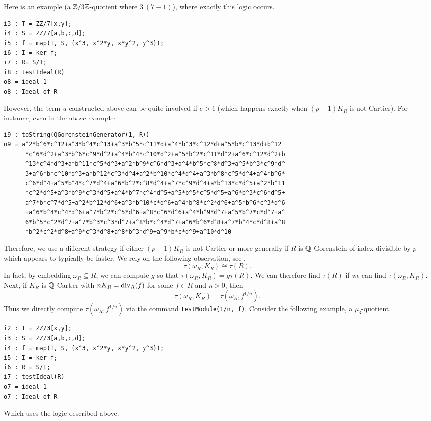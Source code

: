 \documentclass[11pt]{amsart}
\begin{document}
Here is an example (a $\mathbb{Z}/3\mathbb{Z}$-quotient where $3 | (7-1)$), where exactly this logic occurs.
\begin{verbatim}
i3 : T = ZZ/7[x,y];
i4 : S = ZZ/7[a,b,c,d];
i5 : f = map(T, S, {x^3, x^2*y, x*y^2, y^3});
i6 : I = ker f;
i7 : R= S/I;
i8 : testIdeal(R)
o8 = ideal 1
o8 : Ideal of R
\end{verbatim}
However, the term $u$ constructed above can be quite involved if $e > 1$ (which happens exactly when $(p -1)K_R$ is not Cartier).  For instance, even in the above example:
\begin{verbatim}
i9 : toString(QGorensteinGenerator(1, R))
o9 = a^2*b^6*c^12+a^3*b^4*c^13+a^3*b^5*c^11*d+a^4*b^3*c^12*d+a^5*b*c^13*d+b^12
      *c^6*d^2+a^3*b^6*c^9*d^2+a^4*b^4*c^10*d^2+a^5*b^2*c^11*d^2+a^6*c^12*d^2+b
      ^13*c^4*d^3+a*b^11*c^5*d^3+a^2*b^9*c^6*d^3+a^4*b^5*c^8*d^3+a^5*b^3*c^9*d^
      3+a^6*b*c^10*d^3+a*b^12*c^3*d^4+a^2*b^10*c^4*d^4+a^3*b^8*c^5*d^4+a^4*b^6*
      c^6*d^4+a^5*b^4*c^7*d^4+a^6*b^2*c^8*d^4+a^7*c^9*d^4+a*b^13*c*d^5+a^2*b^11
      *c^2*d^5+a^3*b^9*c^3*d^5+a^4*b^7*c^4*d^5+a^5*b^5*c^5*d^5+a^6*b^3*c^6*d^5+
      a^7*b*c^7*d^5+a^2*b^12*d^6+a^3*b^10*c*d^6+a^4*b^8*c^2*d^6+a^5*b^6*c^3*d^6
      +a^6*b^4*c^4*d^6+a^7*b^2*c^5*d^6+a^8*c^6*d^6+a^4*b^9*d^7+a^5*b^7*c*d^7+a^
      6*b^5*c^2*d^7+a^7*b^3*c^3*d^7+a^8*b*c^4*d^7+a^6*b^6*d^8+a^7*b^4*c*d^8+a^8
      *b^2*c^2*d^8+a^9*c^3*d^8+a^8*b^3*d^9+a^9*b*c*d^9+a^10*d^10
\end{verbatim}
Therefore, we use a different strategy if either $(p-1)K_R$ is not Cartier or more generally if $R$ is $\mathbb{Q}$-Gorenstein of index divisible by $p$ which appears to typically be faster.  We rely on the following observation, see \cite{}.
\[
\tau(\omega_R, K_R) \cong \tau(R).
\]
In fact, by embedding $\omega_R \subseteq R$, we can compute $g$ so that $\tau(\omega_R, K_R) = g \tau(R)$.  We can therefore find $\tau(R)$ if we can find $\tau(\omega_R, K_R)$.
Next, if $K_R$ is $\mathbb{Q}$-Cartier with $nK_R = \operatorname{{div}}_R(f)$ for some $f \in R$ and $n > 0$, then
\[
\tau(\omega_R, K_R) =\tau(\omega_R, f^{1/n}).
\]
Thus we directly compute $\tau(\omega_R, f^{1/n})$ via the command {\tt testModule(1/n, f)}.  Consider the following example, a $\mu_3$-quotient.
\begin{verbatim}
i2 : T = ZZ/3[x,y];
i3 : S = ZZ/3[a,b,c,d];
i4 : f = map(T, S, {x^3, x^2*y, x*y^2, y^3});
i5 : I = ker f;
i6 : R = S/I;
i7 : testIdeal(R)
o7 = ideal 1
o7 : Ideal of R
\end{verbatim}
Which uses the logic described above.
\end{document}
